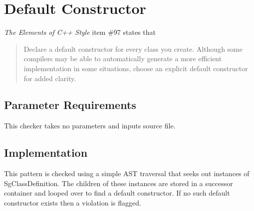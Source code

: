%
%

\section{Default Constructor}
\label{DefaultConstructor::overview}

{\it The Elements of C++ Style} item \#97 states that
\begin{quote}
Declare a default constructor for every class you create. Although some compilers may be able to automatically generate a more efficient implementation in some situations, choose an explicit default constructor for added clarity.
\end{quote}

\subsection{Parameter Requirements}
This checker takes no parameters and inputs source file.

\subsection{Implementation}
This pattern is checked using a simple AST traversal that seeks out instances of SgClassDefinition. The children of these instances are stored in a successor container and looped over to find a default constructor. If no such default constructor exists then a violation is flagged.


